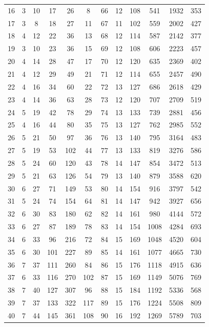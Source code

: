 \documentclass[12pt,a4paper]{article}
\theoremstyle{definition}
\begin{document}
\begin{center}
\begin{tabular}{|c|c|c|c|c|c||c|c|c|c|c|c|}
16 & 3 & 10 & 17 & 26 & 8 & 66 & 12 & 108 & 541 & 1932 & 353 \\
17 & 3 & 8 & 18 & 27 & 11 & 67 & 11 & 102 & 559 & 2002 & 427 \\
18 & 4 & 12 & 22 & 36 & 13 & 68 & 12 & 114 & 587 & 2142 & 377 \\
19 & 3 & 10 & 23 & 36 & 15 & 69 & 12 & 108 & 606 & 2223 & 457 \\
20 & 4 & 14 & 28 & 47 & 17 & 70 & 12 & 120 & 635 & 2369 & 402 \\
21 & 4 & 12 & 29 & 49 & 21 & 71 & 12 & 114 & 655 & 2457 & 490 \\
22 & 4 & 16 & 34 & 60 & 22 & 72 & 13 & 127 & 686 & 2618 & 429 \\
23 & 4 & 14 & 36 & 63 & 28 & 73 & 12 & 120 & 707 & 2709 & 519 \\
24 & 5 & 19 & 42 & 78 & 29 & 74 & 13 & 133 & 739 & 2881 & 456 \\
25 & 4 & 16 & 44 & 80 & 35 & 75 & 13 & 127 & 762 & 2985 & 552 \\
26 & 5 & 21 & 50 & 97 & 36 & 76 & 13 & 140 & 795 & 3164 & 483 \\
27 & 5 & 19 & 53 & 102 & 44 & 77 & 13 & 133 & 819 & 3276 & 586 \\
28 & 5 & 24 & 60 & 120 & 43 & 78 & 14 & 147 & 854 & 3472 & 513 \\
29 & 5 & 21 & 63 & 126 & 54 & 79 & 13 & 140 & 879 & 3588 & 620 \\
30 & 6 & 27 & 71 & 149 & 53 & 80 & 14 & 154 & 916 & 3797 & 542 \\
31 & 5 & 24 & 74 & 154 & 64 & 81 & 14 & 147 & 942 & 3927 & 656 \\
32 & 6 & 30 & 83 & 180 & 62 & 82 & 14 & 161 & 980 & 4144 & 572 \\
33 & 6 & 27 & 87 & 189 & 78 & 83 & 14 & 154 & 1008 & 4284 & 693 \\
34 & 6 & 33 & 96 & 216 & 72 & 84 & 15 & 169 & 1048 & 4520 & 604 \\
35 & 6 & 30 & 101 & 227 & 89 & 85 & 14 & 161 & 1077 & 4665 & 730 \\
36 & 7 & 37 & 111 & 260 & 84 & 86 & 15 & 176 & 1118 & 4915 & 636 \\
37 & 6 & 33 & 116 & 270 & 102 & 87 & 15 & 169 & 1149 & 5076 & 769 \\
38 & 7 & 40 & 127 & 307 & 96 & 88 & 15 & 184 & 1192 & 5336 & 568 \\
39 & 7 & 37 & 133 & 322 & 117 & 89 & 15 & 176 & 1224 & 5508 & 809 \\
40 & 7 & 44 & 145 & 361 & 108 & 90 & 16 & 192 & 1269 & 5789 & 703 \\

\end{tabular}
\end{center}
\end{document}
